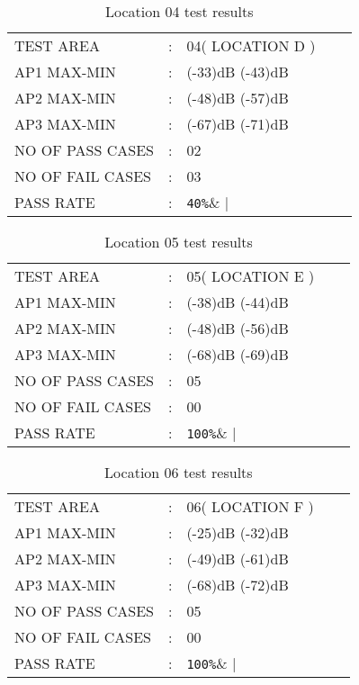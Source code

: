 \documentclass{report}
\begin{document}
	\begin{table}[H]
		\centering
		\label{LOCATION FOUR TEST}
		\begin{tabular}{lllll}
			TEST AREA& :&  04( LOCATION D )&    \\
			AP1 MAX-MIN& :& (-33)dB (-43)dB&  \\
			AP2 MAX-MIN& :& (-48)dB (-57)dB&   \\
			AP3 MAX-MIN& :& (-67)dB (-71)dB&   \\
			NO OF PASS CASES& :& 02&  \\
			NO OF FAIL CASES& :& 03&   \\
			PASS RATE& :& \verb|40%|&   
		\end{tabular}
		\caption{Location 04 test results}
	\end{table} 
	
	\begin{table}[H]
		\centering
		\label{LOCATION FIVE TEST}
		\begin{tabular}{lllll}
			TEST AREA& :&  05( LOCATION E )&    \\
			AP1 MAX-MIN& :& (-38)dB (-44)dB&  \\
			AP2 MAX-MIN& :& (-48)dB (-56)dB&   \\
			AP3 MAX-MIN& :& (-68)dB (-69)dB&   \\
			NO OF PASS CASES& :& 05&  \\
			NO OF FAIL CASES& :& 00&   \\
			PASS RATE& :& \verb|100%|&   
		\end{tabular}
		\caption{Location 05 test results}
	\end{table}
	
	\begin{table}[H]
		\centering
		\label{LOCATION SIX TEST}
		\begin{tabular}{lllll}
			TEST AREA& :&  06( LOCATION F )&    \\
			AP1 MAX-MIN& :& (-25)dB (-32)dB&  \\
			AP2 MAX-MIN& :& (-49)dB (-61)dB&   \\
			AP3 MAX-MIN& :& (-68)dB (-72)dB&   \\
			NO OF PASS CASES& :& 05&  \\
			NO OF FAIL CASES& :& 00&   \\
			PASS RATE& :& \verb|100%|&   
		\end{tabular}
		\caption{Location 06 test results}
	\end{table}
	
\end{document}
